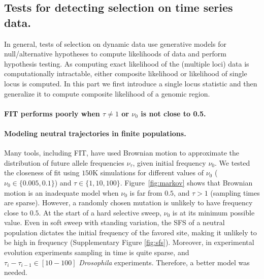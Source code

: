 \documentclass[11pt]{article}
\begin{document}
\subsection{Tests for detecting selection on time series data.}
In general, tests of selection on dynamic data use generative models for null/alternative hypotheses to compute likelihoods of data and perform hypothesis testing. As computing exact likelihood of the (multiple loci) data is computationally intractable, either composite likelihood or likelihood of single locus is computed. In this part we first introduce a single locus statistic and then generalize it to compute composite likelihood of a genomic region.

\paragraph{FIT performs poorly when $\tau \neq 1$ or $\nu_0$ is not close to 
0.5.}
\paragraph{Modeling neutral trajectories in finite populations.} 

Many
tools, including FIT, have used Brownian motion to approximate the
distribution of future allele frequencies $\nu_{\tau}$, given initial
frequency $\nu_0$. We tested the closeness of fit using $150$K
simulations for different values of $\nu_0$ ($\nu_0\in\{0.005,0.1\}$)
and $\tau\in \{1,10,100\}$. Figure~\ref{fig:markov} shows that
Brownian motion is an inadequate model when $\nu_0$ is far from $0.5$,
and $\tau>1$ (sampling times are sparse). However, a randomly chosen
mutation is unlikely to have frequency close to $0.5$. At the start of
a hard selective sweep, $\nu_0$ is at its minimum possible value. Even
in soft sweep with standing variation, the SFS of a neutral population
dictates the initial frequency of the favored site, making it unlikely
to be high in frequency (Supplementary Figure
\ref{fig:sfs}). Moreover, in experimental evolution experiments
sampling in time is quite sparse, and $\tau_i-\tau_{i-1}\in [10-100]$
\emph{Drosophila} experiments. Therefore, a better model was needed.
\end{document}
